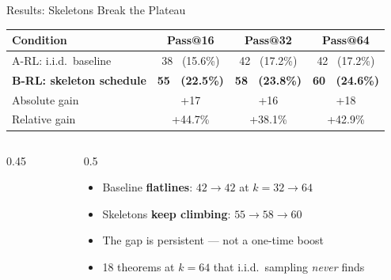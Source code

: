 \documentclass[aspectratio=169]{beamer}
\begin{document}
\begin{frame}{Results: Skeletons Break the Plateau}

\begin{table}
\centering
\begin{tabular}{lccc}
\toprule
\textbf{Condition} & \textbf{Pass@16} & \textbf{Pass@32} & \textbf{Pass@64} \\
\midrule
A-RL: i.i.d.\ baseline & 38 ~(15.6\%) & 42 ~(17.2\%) & 42 ~(17.2\%) \\
\textbf{B-RL: skeleton schedule} & \textbf{55 ~(22.5\%)} & \textbf{58 ~(23.8\%)} & \textbf{60 ~(24.6\%)} \\
\midrule
Absolute gain & +17 & +16 & +18 \\
Relative gain & +44.7\% & +38.1\% & +42.9\% \\
\bottomrule
\end{tabular}
\end{table}

\vspace{0.3em}
\begin{columns}
\begin{column}{0.45\textwidth}
\centering
{}
\end{column}
\begin{column}{0.5\textwidth}
\begin{itemize}
    \item Baseline \textbf{flatlines}: $42 \to 42$ at $k{=}32 \to 64$
    \item Skeletons \textbf{keep climbing}: $55 \to 58 \to 60$
    \item The gap is persistent --- not a one-time boost
    \item 18 theorems at $k{=}64$ that i.i.d.\ sampling \emph{never} finds
\end{itemize}
\end{column}
\end{columns}
\end{frame}
\end{document}

